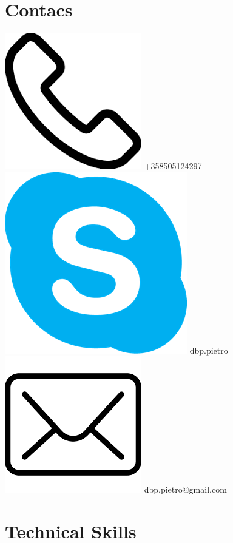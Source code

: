 \documentclass[]{friggeri-cv}
\begin{document}
\begin{aside}
  \section{Contacs}
   \includegraphics[scale=0.03]{img/phone.png} +358505124297
   \includegraphics[scale=0.03]{img/skype.png} dbp.pietro 
    \includegraphics[scale=0.03]{img/mail.png} dbp.pietro@gmail.com 
~ 
  \section{Technical Skills}
    ~

\end{aside}
\end{document}
